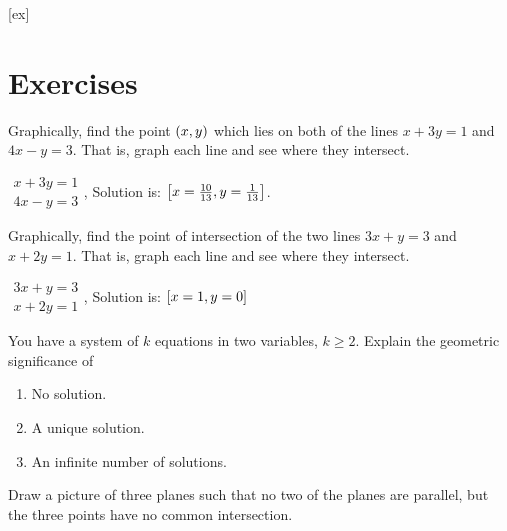 [ex]
\section*{Exercises}

\begin{enumialphparenastyle}

\begin{ex}
Graphically, find the point $\left(x,y\right)$ which
lies on both of the lines $x+3y=1$ and $4x-y=3$. That is, graph each line
and see where they intersect.

\begin{sol}
$\begin{array}{c}
x+3y=1 \\
4x-y=3
\end{array}$, Solution is: $\left[x=\frac{10}{13},y=\frac{1}{13}\right] $.
\end{sol}
\end{ex}


\begin{ex}
Graphically, find the point of intersection of the two lines $
3x+y=3$ and $x+2y=1.$ That is, graph each line
and see where they intersect. 

\begin{sol}
$\begin{array}{c}
3x+y=3 \\
x+2y=1
\end{array}
$, Solution is: $\left[x=1,y=0\right] $
\end{sol}
\end{ex}

\begin{ex} You have a system of $k$ equations in two variables, $k\geq 2$.
Explain the geometric significance of

\begin{enumerate}
\item No solution.

\item A unique solution.

\item An infinite number of solutions.
\end{enumerate}

\end{ex}

\begin{ex}
  Draw a picture of three planes such that no two of the planes are
  parallel, but the three points have no common intersection.


\end{ex}
\end{enumialphparenastyle}
